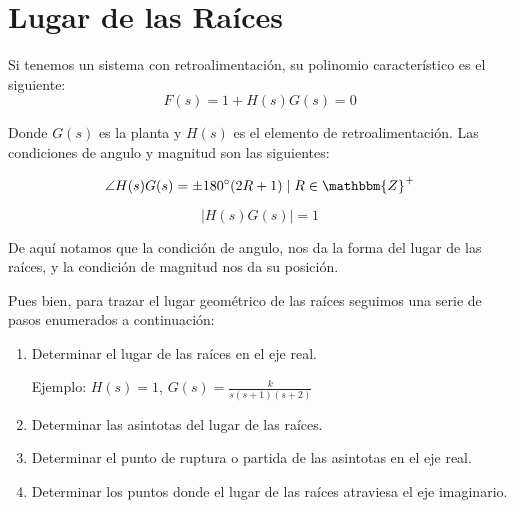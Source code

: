 \section{Lugar de las Raíces}
Si tenemos un sistema con retroalimentación, su polinomio característico es el siguiente:
\begin{equation}
F(s) = 1 + H(s) G(s) = 0
\end{equation}

Donde $G(s)$ es la planta y $H(s)$ es el elemento de retroalimentación. Las condiciones de angulo y magnitud son las siguientes:

\begin{equation}
\angle H(s) G(s) = \pm 180^{\circ} (2R + 1) \mid R \in \mathbbm{Z}^+
\end{equation}

\begin{equation}
\lvert H(s) G(s) \rvert = 1
\end{equation}

De aquí notamos que la condición de angulo, nos da la forma del lugar de las raíces, y la condición de magnitud nos da su posición.

Pues bien, para trazar el lugar geométrico de las raíces seguimos una serie de pasos enumerados a continuación:

\begin{enumerate}
\item
Determinar el lugar de las raíces en el eje real.

Ejemplo: $H(s) = 1$, $G(s) = \frac{k}{s(s+1)(s+2)}$


\item
Determinar las asintotas del lugar de las raíces.
\item
Determinar el punto de ruptura o partida de las asintotas en el eje real.
\item
Determinar los puntos donde el lugar de las raíces atraviesa el eje imaginario.
\end{enumerate}
